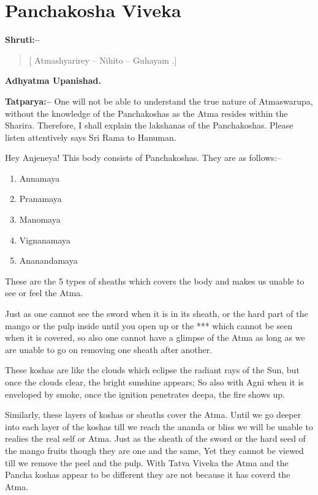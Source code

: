 \chapter{Panchakosha Viveka}

\textbf{Shruti:–}

\begin{verse}
[ Atmashyarirey – Nihito – Guhayam .]
\end{verse}

\begin{flushright}
\textbf{Adhyatma Upanishad.}
\end{flushright}

\textbf{Tatparya:–} One will not be able to understand the true nature of Atmaswarupa, without the knowledge of the Panchakoshas as the Atma resides within the Sharira. Therefore, I shall explain the lakshanas of the Panchakoshas. Please listen attentively says Sri Rama to Hanuman.

Hey Anjeneya! This body consists of Panchakoshas. They are as follows:–

\begin{enumerate}
\item Annamaya

 \item Pranamaya

 \item Manomaya

 \item Vignanamaya

 \item Ananandamaya

\end{enumerate}

These are the 5 types of sheaths which covers the body and makes us unable to see or feel the Atma.

Just as one cannot see the sword when it is in its sheath, or the hard part of the mango or the pulp inside until you open up or the *** which cannot be seen when it is covered, so also one cannot have a glimpse of the Atma as long as we are unable to go on removing one sheath after another.

These koshas are like the clouds which eclipse the radiant rays of the Sun, but once the clouds clear, the bright sunshine appears; So also with Agni when it is enveloped by smoke, once the ignition penetrates deepa, the fire shows up.

Similarly, these layers of koshas or sheaths cover the Atma. Until we go deeper into each layer of the koshas till we reach the ananda or bliss we will be unable to realies the real self or Atma. Just as the sheath of the sword or the hard seed of the mango fruits though they are one and the same, Yet they cannot be viewed till we remove the peel and the pulp. With Tatva Viveka the Atma and the Pancha koshas appear to be different they are not because it has coverd the Atma.


